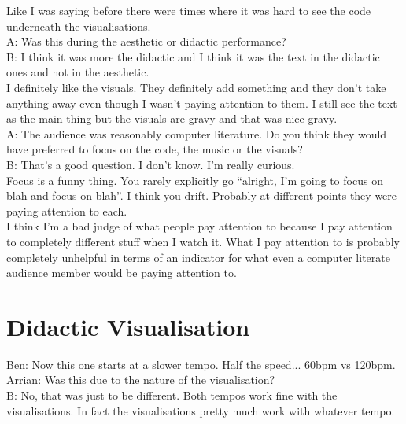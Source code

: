 Like I was saying before there were times where it was hard to see the code underneath the visualisations.\\

A: Was this during the aesthetic or didactic performance?\\

B: I think it was more the didactic and I think it was the text in the didactic ones and not in the aesthetic.\\

I definitely like the visuals. They definitely add something and they don't take anything away even though I wasn't paying attention to them. I still see the text as the main thing but the visuals are gravy and that was nice gravy.\\

A: The audience was reasonably computer literature. Do you think they would have preferred to focus on the code, the music or the visuals?\\

B: That's a good question. I don't know. I'm really curious.\\

Focus is a funny thing. You rarely explicitly go ``alright, I'm going to focus on blah and focus on blah''. I think you drift. Probably at different points they were paying attention to each.\\

I think I'm a bad judge of what people pay attention to because I pay attention to completely different stuff when I watch it. What I pay attention to is probably completely unhelpful in terms of an indicator for what even a computer literate audience member would be paying attention to.\\

\section*{Didactic Visualisation}

Ben: Now this one starts at a slower tempo. Half the speed... 60bpm vs 120bpm.\\

Arrian: Was this due to the nature of the visualisation?\\

B: No, that was just to be different. Both tempos work fine with the visualisations. In fact the visualisations pretty much work with whatever tempo.\\

